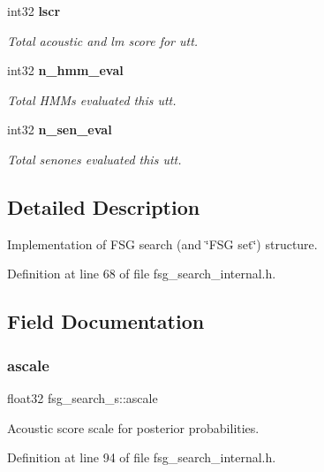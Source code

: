 \begin{DoxyCompactItemize}
\item 
\mbox{\label{structfsg__search__s_a709277a80e9418ecc3e63296f8eb6bbf}} 
int32 \textbf{ lscr}
\begin{DoxyCompactList}\small\item\em Total acoustic and lm score for utt. \end{DoxyCompactList}\item 
\mbox{\label{structfsg__search__s_a7e3d7375b4a33af339e8b55885677faa}} 
int32 \textbf{ n\+\_\+hmm\+\_\+eval}
\begin{DoxyCompactList}\small\item\em Total H\+M\+Ms evaluated this utt. \end{DoxyCompactList}\item 
\mbox{\label{structfsg__search__s_a56494e3b30d0c66367c7ef055b8addb2}} 
int32 \textbf{ n\+\_\+sen\+\_\+eval}
\begin{DoxyCompactList}\small\item\em Total senones evaluated this utt. \end{DoxyCompactList}\end{DoxyCompactItemize}


\subsection{Detailed Description}
Implementation of F\+SG search (and \char`\"{}\+F\+S\+G set\char`\"{}) structure. 

Definition at line 68 of file fsg\+\_\+search\+\_\+internal.\+h.



\subsection{Field Documentation}
\mbox{\label{structfsg__search__s_a4d13fff2e14882b0125386fc27a4097f}} 
\subsubsection{ascale}
{\footnotesize\ttfamily float32 fsg\+\_\+search\+\_\+s\+::ascale}



Acoustic score scale for posterior probabilities. 



Definition at line 94 of file fsg\+\_\+search\+\_\+internal.\+h.

